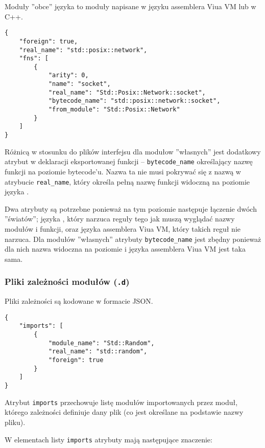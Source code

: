 Moduły ''obce'' języka \ViuAct to moduły napisane w języku assemblera Viua VM lub w C++.

\begin{small}
\begin{lstlisting}
{
    "foreign": true,
    "real_name": "std::posix::network",
    "fns": [
        {
            "arity": 0,
            "name": "socket",
            "real_name": "Std::Posix::Network::socket",
            "bytecode_name": "std::posix::network::socket",
            "from_module": "Std::Posix::Network"
        }
    ]
}
\end{lstlisting}
\end{small}

Różnicą w stosunku do plików interfejsu dla modułow ''własnych'' jest dodatkowy atrybut w deklaracji
eksportowanej funkcji -- \texttt{bytecode\_name} określający nazwę funkcji na poziomie bytecode'u. Nazwa ta
nie musi pokrywać się z nazwą w atrybucie \texttt{real\_name}, który określa pełną nazwę funkcji widoczną na
poziomie języka \ViuAct.

Dwa atrybuty są potrzebne ponieważ na tym poziomie następuje łączenie dwóch ''światów''; języka \ViuAct, który
narzuca reguły tego jak muszą wyglądać nazwy modułów i funkcji, oraz języka assemblera Viua VM, który takich
reguł nie narzuca. Dla modułów ''własnych'' atrybuty \texttt{bytecode\_name} jest zbędny ponieważ dla nich
nazwa widoczna na poziomie \ViuAct i języka assemblera Viua VM jest taka sama.

\subsubsection{Pliki zależności modułów (\texttt{.d})}
\label{pliki_zaleznosci_modulow}

Pliki zależności są kodowane w formacie JSON.

\begin{small}
\begin{lstlisting}
{
    "imports": [
        {
            "module_name": "Std::Random",
            "real_name": "std::random",
            "foreign": true
        }
    ]
}
\end{lstlisting}
\end{small}

Atrybut \texttt{imports} przechowuje listę modułów importowanych przez moduł, którego zależności definiuje
dany plik (co jest określane na podstawie nazwy pliku).

W elementach listy \texttt{imports} atrybuty mają następujące znaczenie:

